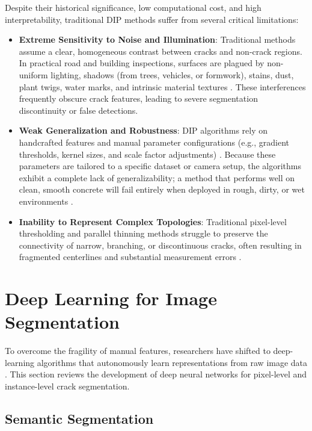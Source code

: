 Despite their historical significance, low computational cost, and high interpretability, traditional DIP methods suffer from several critical limitations:
\begin{itemize}
    \item \textbf{Extreme Sensitivity to Noise and Illumination}: Traditional methods assume a clear, homogeneous contrast between cracks and non-crack regions. In practical road and building inspections, surfaces are plagued by non-uniform lighting, shadows (from trees, vehicles, or formwork), stains, dust, plant twigs, water marks, and intrinsic material textures \cite{liu-2019,kirchhoff-2024,sohaib-2024,zhang-2024c}. These interferences frequently obscure crack features, leading to severe segmentation discontinuity or false detections.
    \item \textbf{Weak Generalization and Robustness}: DIP algorithms rely on handcrafted features and manual parameter configurations (e.g., gradient thresholds, kernel sizes, and scale factor adjustments) \cite{zhang-2024a}. Because these parameters are tailored to a specific dataset or camera setup, the algorithms exhibit a complete lack of generalizability; a method that performs well on clean, smooth concrete will fail entirely when deployed in rough, dirty, or wet environments \cite{liu-2019}.
    \item \textbf{Inability to Represent Complex Topologies}: Traditional pixel-level thresholding and parallel thinning methods struggle to preserve the connectivity of narrow, branching, or discontinuous cracks, often resulting in fragmented centerlines and substantial measurement errors \cite{liu-2019,zhang-2025,zhang-2024b}.
\end{itemize}

\section{Deep Learning for Image Segmentation}

\hs To overcome the fragility of manual features, researchers have shifted to deep-learning algorithms that autonomously learn representations from raw image data \cite{zhang-2024a}. This section reviews the development of deep neural networks for pixel-level and instance-level crack segmentation.

\subsection{Semantic Segmentation}

